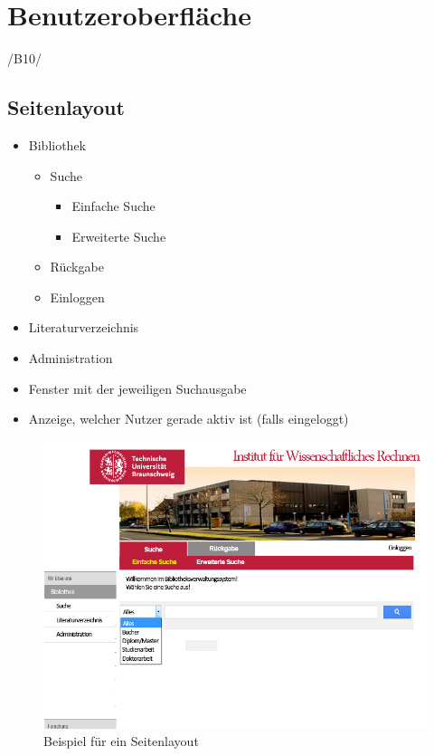\chapter{Benutzeroberfläche}

/B10/

\section{Seitenlayout}

 \begin{itemize}
   \item Bibliothek
   \begin{itemize}
    \item Suche
      \begin{itemize}
       \item Einfache Suche
       \item Erweiterte Suche
       \end{itemize}
      \item Rückgabe
      \item Einloggen
    \end{itemize}
    \item Literaturverzeichnis
    \item Administration
 \end{itemize}

\begin{itemize}
\item Fenster mit der jeweiligen Suchausgabe 
\item Anzeige, welcher Nutzer gerade aktiv ist	(falls eingeloggt)
\end{itemize}
  	 	
\begin{figure}
\includegraphics[width=0.8\linewidth]{bilder/layout2.jpg}
\caption[lol]{Beispiel für ein Seitenlayout}
\end{figure}


